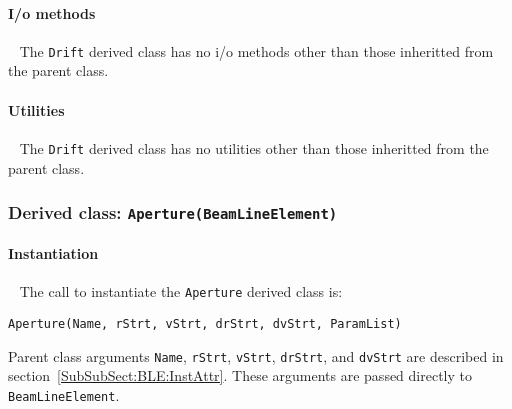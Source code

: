 \paragraph{I/o methods} ~\newline
\noindent
The \texttt{Drift} derived class has no i/o methods other than
those inheritted from the parent class.

\paragraph{Utilities} ~\newline
\noindent
The \texttt{Drift} derived class has no utilities other than those
inheritted from the parent class. 

\FloatBarrier

\subsubsection{Derived class: \texttt{Aperture(BeamLineElement)}}

\paragraph{Instantiation} ~\newline
\noindent
The call to instantiate the \texttt{Aperture} derived class is:
\begin{center}
  \texttt{Aperture(Name, rStrt, vStrt, drStrt, dvStrt, ParamList)}
\end{center}
Parent class arguments \texttt{Name}, \texttt{rStrt}, \texttt{vStrt},
\texttt{drStrt}, and \texttt{dvStrt} are described in
section~\ref{SubSubSect:BLE:InstAttr}.
These arguments are passed directly to \texttt{BeamLineElement}.

